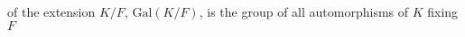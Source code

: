 \documentclass[preview]{standalone}
\begin{document}
\begin{center}
of the extension $K/F$, $\text{Gal}(K/F)$, is the group of all automorphisms of $K$ fixing $F$
\end{center}
\end{document}
